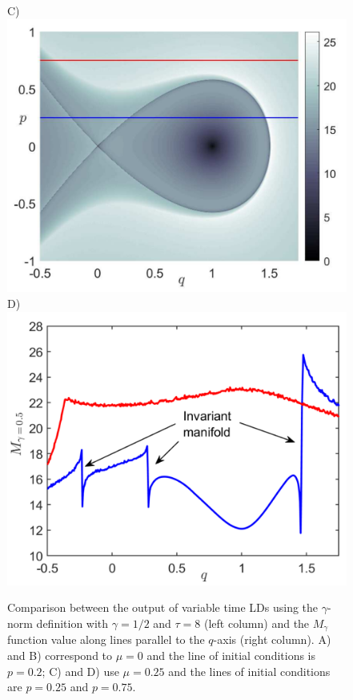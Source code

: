 \documentclass{ws-ijbc}
\begin{document}
\begin{figure}[htbp]
\begin{center}
		C)\includegraphics[scale=0.32]{fig2c}
		D)\includegraphics[scale=0.32]{fig2d}
	\end{center}
	\caption{Comparison between the output of variable time LDs using the $\gamma$-norm definition with $\gamma = 1/2$ and $\tau = 8$ (left column) and the $M_\gamma$ function value along lines parallel to the $q$-axis (right column). A) and B) correspond to $\mu = 0$ and the line of initial conditions is $p = 0.2$; C) and D) use $\mu = 0.25$ and the lines of initial conditions are $p = 0.25$ and $p = 0.75$. }
	\label{ld_bif_sn_transf}
\end{figure}
\end{document}
